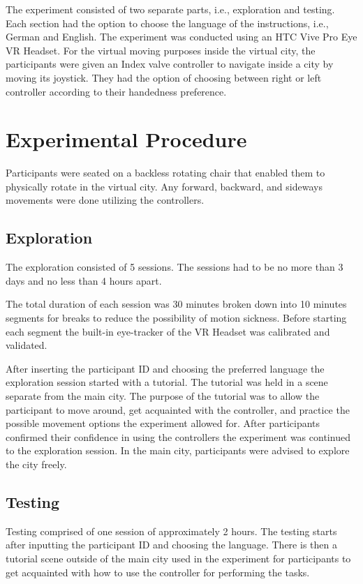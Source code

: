 The experiment consisted of two separate parts, i.e., exploration and testing.  Each section had the option to choose the language of the instructions, i.e., German and English. The experiment was conducted using an HTC Vive Pro Eye VR Headset. For the virtual moving purposes inside the virtual city, the participants were given an Index valve controller to navigate inside a city by moving its joystick. They had the option of choosing between right or left controller according to their handedness preference.

\section{Experimental Procedure}

Participants were seated on a backless rotating chair that enabled them to physically rotate in the virtual city. Any forward, backward, and sideways movements were done utilizing the controllers.

\subsection{Exploration}

The exploration consisted of 5 sessions. The sessions had to be no more than 3 days and no less than 4 hours apart. 

The total duration of each session was 30 minutes broken down into 10 minutes segments for breaks to reduce the possibility of motion sickness. Before starting each segment the built-in eye-tracker of the VR Headset was calibrated and validated. 

After inserting the participant ID and choosing the preferred language the exploration session started with a tutorial. The tutorial was held in a scene separate from the main city. The purpose of the tutorial was to allow the participant to move around, get acquainted with the controller, and practice the possible movement options the experiment allowed for. After participants confirmed their confidence in using the controllers the experiment was continued to the exploration session. In the main city, participants were advised to explore the city freely.

\subsection{Testing}

Testing comprised of one session of approximately 2 hours. The testing starts after inputting the participant ID and choosing the language. There is then a tutorial scene outside of the main city used in the experiment for participants to get acquainted with how to use the controller for performing the tasks. 

